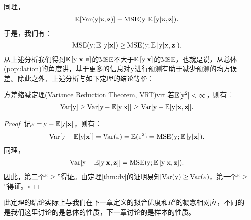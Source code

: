 \documentclass[cn,11pt,chinese]{elegantbook}
\begin{document}
同理，
\begin{eqnarray*}
	\mathbb{E}[{\rm{Var}}({\rm{y}}|\bold{x},\bold{z})]=\mathrm{MSE}(\rm{y};\mathbb{E}\left[\rm{y}|\bold{x},\bold{z}\right]).
\end{eqnarray*}
于是，我们有：
\begin{eqnarray*}
	\mathrm{MSE}(\rm{y};\mathbb{E}\left[\rm{y}|\bold{x}\right])\geq \mathrm{MSE}(\rm{y};\mathbb{E}\left[\rm{y}|\bold{x},\bold{z}\right]).
\end{eqnarray*}
从上述分析我们得到$\mathbb{E}\left[\rm{y}|\bold{x},\bold{z}\right]$的MSE不大于$\mathbb{E}\left[\rm{y}|\bold{x}\right]$的MSE，也就是说，从总体(population)的角度讲，基于更多的信息对$\rm{y}$进行预测有助于减少预测的均方误差。除此之外，上述分析与如下定理的结论等价：
\begin{theorem}{方差缩减定理(Variance Reduction Theorem, VRT)}{vrt}
	若$\mathbb{E}[\rm{y}^{2}]<\infty$，则有：
	\begin{eqnarray*}
		\mathrm{Var}[\rm{y}]\geq \mathrm{Var}[\rm{y}-\mathbb{E}[\rm{y}|\bold{x}]]\geq \mathrm{Var}[\rm{y}-\mathbb{E}[\rm{y}|\bold{x},\bold{z}]].
	\end{eqnarray*}
\end{theorem}
\begin{proof}
	记$\varepsilon=\rm{y}-\mathbb{E}[\rm{y}|\bold{x}]$，则有：
	\begin{eqnarray*}
		\mathrm{Var}[\rm{y}-\mathbb{E}[\rm{y}|\bold{x}]]=\mathrm{Var}(\varepsilon)=\mathbb{E}(\varepsilon^{2})=\mathrm{MSE}(\rm{y};\mathbb{E}\left[\rm{y}|\bold{x}\right]).
	\end{eqnarray*}
	同理，
	\begin{eqnarray*}
		\mathrm{Var}[\rm{y}-\mathbb{E}[\rm{y}|\bold{x},\bold{z}]]=\mathrm{MSE}(\rm{y};\mathbb{E}\left[\rm{y}|\bold{x},\bold{z}\right]).
	\end{eqnarray*}
	因此，第二个“$\geq$”得证。由定理\ref{thm:dv}的证明易知$\mathrm{Var}(\rm{y})\geq\mathrm{Var}(\varepsilon)$，第一个“$\geq$”得证。\hfill$\square$
\end{proof}
此定理的结论实际上与我们在下一章定义的拟合优度和$R^2$的概念相对应，不同的是我们这里讨论的是总体的性质，下一章讨论的是样本的性质。
\end{document}
